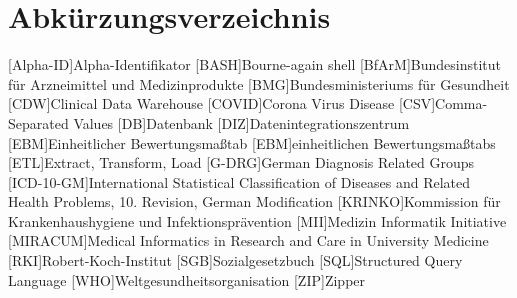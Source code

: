 \chapter*{Abkürzungsverzeichnis}
\setcounter{page}{3}
\begin{acronym}[acrmeta]
	[Alpha-ID]{Alpha-Identifikator}
	[BASH]{Bourne-again shell}		
	[BfArM]{Bundesinstitut für Arzneimittel und Medizinprodukte}
	[BMG]{Bundesministeriums für Gesundheit}	
	[CDW]{Clinical Data Warehouse}
	[COVID]{Corona Virus Disease}	
	[CSV]{Comma-Separated Values}	
	[DB]{Datenbank}
	[DIZ]{Datenintegrationszentrum}	
	[EBM]{Einheitlicher Bewertungsmaßtab}
	[EBM]{einheitlichen Bewertungsmaßtabs}
	[ETL]{Extract, Transform, Load}
	[G-DRG]{German Diagnosis Related Groups}	
	[ICD-10-GM]{International Statistical Classification of Diseases and Related Health Problems, 10. Revision, German Modification}	
	[KRINKO]{Kommission für Krankenhaushygiene und Infektionsprävention}	
	[MII]{Medizin Informatik Initiative}
	[MIRACUM]{Medical Informatics in Research and Care in University Medicine}
	[RKI]{Robert-Koch-Institut}
	[SGB]{Sozialgesetzbuch}
	[SQL]{Structured Query Language}
	[WHO]{Weltgesundheitsorganisation}
	[ZIP]{Zipper}
\end{acronym}
